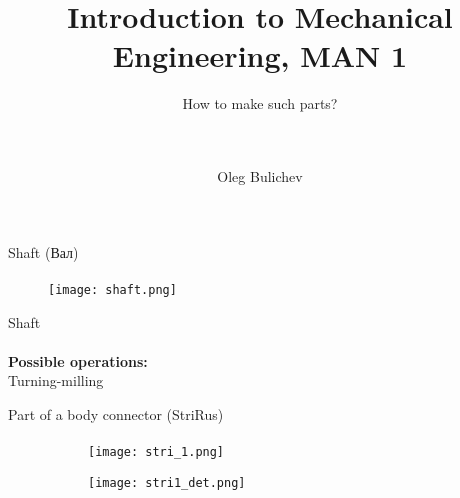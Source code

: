 \documentclass[aspectratio=169]{beamer}
\title[IME]{Introduction to Mechanical Engineering, MAN 1} %
\subtitle{How to make such parts?
\\ \  \\ \ 
    } %
\author{Oleg Bulichev}
\newcommand{\fbckg}[1]{\usebackgroundtemplate{\texttt{[image: \#1]}}}%
\begin{document}
\setlength{\abovedisplayskip}{0pt}
\setlength{\belowdisplayskip}{0pt}
\setlength{\abovedisplayshortskip}{0pt}
\setlength{\belowdisplayshortskip}{0pt}

\fbckg{fibeamer/figs/title_page.png}

\fbckg{fibeamer/figs/common.png}

\note{\scriptsize
\ 
}

\begin{frame}[c]{Shaft (Вал)}
\framesubtitle{}
    \vspace{-0.6cm}
    \begin{figure}[H]
        \centering\texttt{[image: shaft.png]}
        \label{fig:shaft.png}
    \end{figure}
\end{frame}

\begin{frame}[c]{Shaft}
\framesubtitle{}
    \LARGE \centering
    \textbf{Possible operations: } \\ 
    Turning-milling\\
\end{frame}

\begin{frame}[c]{Part of a body connector (StriRus)}
\framesubtitle{}
    \vspace{-0.6cm}
    \begin{figure}[H]
        \begin{subfigure}{0.49\textwidth}
            \centering\texttt{[image: stri\_1.png]}
            \label{fig:stri_1.png}
        \end{subfigure}
        \begin{subfigure}{0.49\textwidth}
            \centering\texttt{[image: stri1\_det.png]}
            \label{fig:stri1_det.png}
        \end{subfigure}
    
    \end{figure}
\end{frame}
\end{document}
